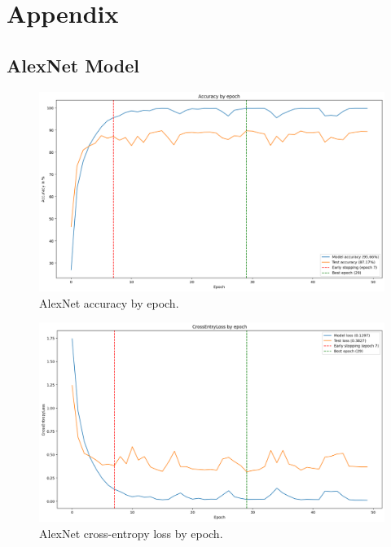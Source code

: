 \newpage
\section*{Appendix}
\label{app:appendix}

\subsection*{AlexNet Model}
\label{app:appendix_alexnet_model}
\begin{figure}
    \centering
    \includegraphics[width=1\textwidth]{assets/alexnet_accuracy.png}
    \caption{AlexNet accuracy by epoch.}
    \label{fig:alexnet_accuracy}
\end{figure}

\begin{figure}
    \centering
    \includegraphics[width=1\textwidth]{assets/alexnet_loss.png}
    \caption{AlexNet cross-entropy loss by epoch.}
    \label{fig:alexnet_loss}
\end{figure}

